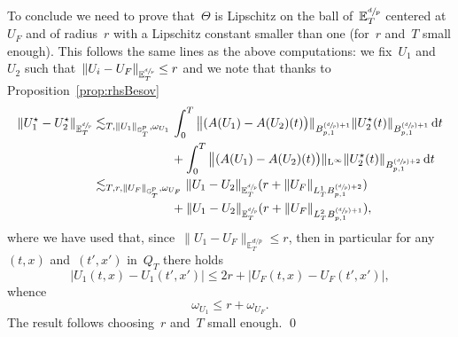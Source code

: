 \documentclass[JEP,XML,SOM,Unicode,published]{cedram}
\newcommand{\Psfrac}[2]{(\sfrac{#1}{#2})}
\theoremstyle{definition}
\newcommand\dd{\mathrm{d}}
\renewcommand\L{\mathrm{L}}
\begin{document}
To conclude we need to prove that~$\Theta$ is Lipschitz on the ball of~${\mathbb E}^{\sfrac dp}_T$ centered at~$U_F$ and of radius~$r$ with a Lipschitz constant smaller than one (for~$r$ and~$T$ small enough). This follows the same lines as the above computations: we fix~$U_1$ and~$U_2$ such that~$\| U_i-U_F\|_{{\mathbb E}^{\sfrac dp}_T} \leq r$ and we note that thanks to Proposition~\ref{prop:rhsBesov}
\[
\begin{aligned}
\|U_1^\star-U_2^\star\|_{{\mathbb E}^{\sfrac dp}_T} & \lesssim_{T, \|U_1\|_{\mathbb G^p_T},\omega_{U_1} } \int_0^T \big \|(A(U_1)- A(U_2)(t)\bigr)\|_{B_{p,1}^{\Psfrac dp+1}} \|U_2^\star(t)\|_{B_{p,1}^{\Psfrac dp+1}} \, \dd t\\
&\hspace*{2.22cm} + \int_0^T \big \|(A(U_1)- A(U_2)(t)\bigr)\|_{\L^\infty} \|U_2^\star(t)\|_{B_{p,1}^{\Psfrac dp+2}} \, \dd t \\
& \lesssim_{T, r,\|U_F\|_{\mathbb G^p_T},\omega_{U_F} } \|U_1 -U_2 \|_{{\mathbb E}^{\sfrac dp}_T} (r+ \|U_F\|_{L^1_TB_{p,1}^{\Psfrac dp+2}}) \\
&\hspace*{2.22cm} +
\|U_1 -U_2 \|_{{\mathbb E}^{\sfrac dp}_T}(r+ \|U_F\|_{L^2_TB_{p,1}^{\Psfrac dp+1}}),
\end{aligned}
\]
where we have used that, since~$\|U_1-U_F\|_{\mathbb{E}_T^{d/p}} \leq r$, then in particular for any~$(t,x) $ and~$ (t',x') $ in~$Q_T$ there holds
\[
|U_1(t,x) - U_1(t',x')| \leq 2r + |U_F(t,x)-U_F(t',x')|,
\]
whence
\[
\omega_{U_1} \leq r + \omega_{U_F}.
\]
The result follows choosing~$r$ and~$T$ small enough.
\qed

\appendix
\end{document}
